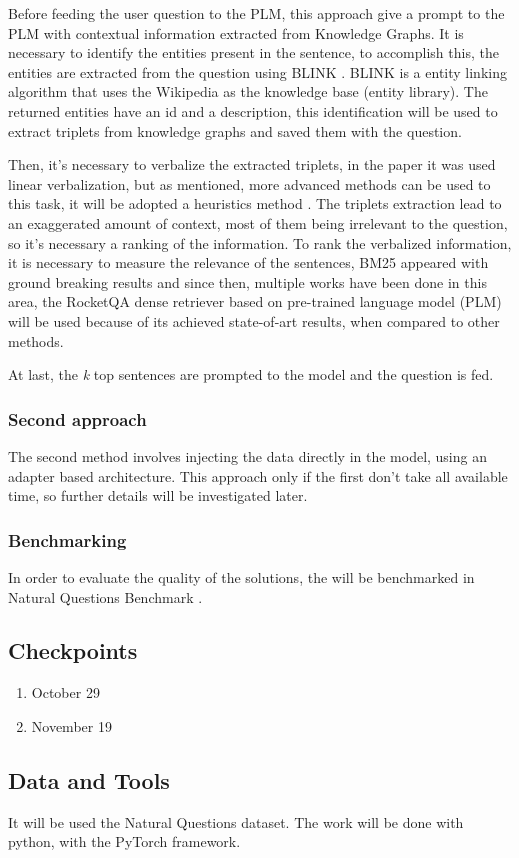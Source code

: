 \documentclass{article}
\begin{document}
Before feeding the user question to the PLM, this approach give a prompt to the PLM with contextual information extracted from Knowledge Graphs. It is necessary to identify the entities present in the sentence, to accomplish this, the entities are extracted from the question using BLINK \cite{wu2019zero}. BLINK is a entity linking algorithm that uses the Wikipedia as the knowledge base (entity library). The returned entities have an id and a description, this identification will be used to extract triplets from knowledge graphs and saved them with the question. 

Then, it's necessary to verbalize the extracted triplets, in the paper it was used linear verbalization, but as mentioned, more advanced methods can be used to this task, it will be adopted a heuristics method \cite{oguz-etal-2022-unik}. The triplets extraction lead to an exaggerated amount of context, most of them being irrelevant to the question, so it's necessary a ranking of the information. To rank the verbalized information, it is necessary to measure the relevance of the sentences, BM25 \cite{INR-019} appeared with ground breaking results and since then, multiple works have been done in this area, the RocketQA \cite{ren-etal-2021-rocketqav2} dense retriever based on pre-trained language model (PLM) will be used because of its achieved state-of-art results, when compared to other methods.

At last, the \textit{k} top sentences are prompted to the model and the question is fed.


\subsubsection{Second approach}

The second method involves injecting the data directly in the model, using an adapter based architecture. This approach only if the first don't take all available time, so further details will be investigated later.


\subsubsection{Benchmarking}

In order to evaluate the quality of the solutions, the will be benchmarked in Natural Questions Benchmark \cite{47761}.


\subsection{Checkpoints}

\begin{enumerate}
	\item October 29
	\item November 19
\end{enumerate}

\subsection{Data and Tools}

It will be used the Natural Questions dataset. The work will be done with python, with the PyTorch framework.


\printbibliography
\end{document}
